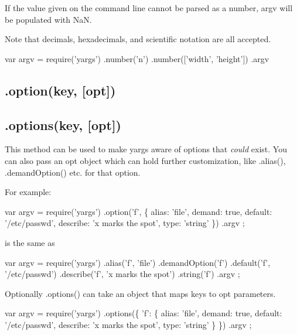 If the value given on the command line cannot be parsed as a number, {\ttfamily argv} will be populated with {\ttfamily NaN}.

Note that decimals, hexadecimals, and scientific notation are all accepted.


\begin{DoxyCode}
var argv = require('yargs')
  .number('n')
  .number(['width', 'height'])
  .argv
\end{DoxyCode}


\subsection*{.option(key, \mbox{[}opt\mbox{]}) }

\subsection*{.options(key, \mbox{[}opt\mbox{]}) }

This method can be used to make yargs aware of options that {\itshape could} exist. You can also pass an {\ttfamily opt} object which can hold further customization, like {\ttfamily .alias()}, {\ttfamily .demand\+Option()} etc. for that option.

For example\+:


\begin{DoxyCode}
var argv = require('yargs')
    .option('f', \{
        alias: 'file',
        demand: true,
        default: '/etc/passwd',
        describe: 'x marks the spot',
        type: 'string'
    \})
    .argv
;
\end{DoxyCode}


is the same as


\begin{DoxyCode}
var argv = require('yargs')
    .alias('f', 'file')
    .demandOption('f')
    .default('f', '/etc/passwd')
    .describe('f', 'x marks the spot')
    .string('f')
    .argv
;
\end{DoxyCode}


Optionally {\ttfamily .options()} can take an object that maps keys to {\ttfamily opt} parameters.


\begin{DoxyCode}
var argv = require('yargs')
    .options(\{
      'f': \{
        alias: 'file',
        demand: true,
        default: '/etc/passwd',
        describe: 'x marks the spot',
        type: 'string'
      \}
    \})
    .argv
;
\end{DoxyCode}


